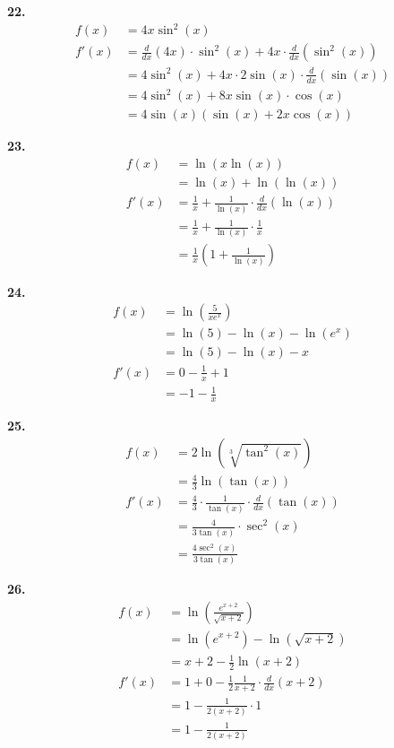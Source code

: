 \documentclass[10pt,oneside,]{book}
\theoremstyle{plain}
\theoremstyle{definition}
\numberwithin{equation}{section}
\newcommand{\fe}[2]{#1\mathopen{}\left(#2\right)\mathclose{}}
\newcommand{\fd}[1]{#1'}
\newcommand{\lzoo}[2]{{\frac{d}{d#1}}{\left(#2\right)}}
\begin{document}
\noindent\textbf{22.}\quad{}\begin{align*}
\fe{f}{x}&=4x\fe{\sin^2}{x}\\
\fe{\fd{f}}{x}&=\lzoo{x}{4x}\cdot\fe{\sin^2}{x}+4x\cdot\lzoo{x}{\fe{\sin^2}{x}}\\
&=4\fe{\sin^2}{x}+4x\cdot2\fe{\sin}{x}\cdot\lzoo{x}{\fe{\sin}{x}}\\
&=4\fe{\sin^2}{x}+8x\fe{\sin}{x}\cdot\fe{\cos}{x}\\
&=4\fe{\sin}{x}\left(\fe{\sin}{x}+2x\fe{\cos}{x}\right)
\end{align*}%
\par\smallskip
\noindent\textbf{23.}\quad{}\begin{align*}
\fe{f}{x}&=\fe{\ln}{x\fe{\ln}{x}}\\
&=\fe{\ln}{x}+\fe{\ln}{\fe{\ln}{x}}\\
\fe{\fd{f}}{x}&=\frac{1}{x}+\frac{1}{\fe{\ln}{x}}\cdot\lzoo{x}{\fe{\ln}{x}}\\
&=\frac{1}{x}+\frac{1}{\fe{\ln}{x}}\cdot\frac{1}{x}\\
&=\frac{1}{x}\left(1+\frac{1}{\fe{\ln}{x}}\right)
\end{align*}%
\par\smallskip
\noindent\textbf{24.}\quad{}\begin{align*}
\fe{f}{x}&=\fe{\ln}{\frac{5}{xe^x}}\\
&=\fe{\ln}{5}-\fe{\ln}{x}-\fe{\ln}{e^x}\\
&=\fe{\ln}{5}-\fe{\ln}{x}-x\\
\fe{\fd{f}}{x}&=0-\frac{1}{x}+1\\
&=-1-\frac{1}{x}
\end{align*}%
\par\smallskip
\noindent\textbf{25.}\quad{}\begin{align*}
\fe{f}{x}&=2\fe{\ln}{\sqrt[3]{\fe{\tan^2}{x}}}\\
&=\frac{4}{3}\fe{\ln}{\fe{\tan}{x}}\\
\fe{\fd{f}}{x}&=\frac{4}{3}\cdot\frac{1}{\fe{\tan}{x}}\cdot\lzoo{x}{\fe{\tan}{x}}\\
&=\frac{4}{3\fe{\tan}{x}}\cdot\fe{\sec^2}{x}\\
&=\frac{4\fe{\sec^2}{x}}{3\fe{\tan}{x}}
\end{align*}%
\par\smallskip
\noindent\textbf{26.}\quad{}\begin{align*}
\fe{f}{x}&=\fe{\ln}{\frac{e^{x+2}}{\sqrt{x+2}}}\\
&=\fe{\ln}{e^{x+2}}-\fe{\ln}{\sqrt{x+2}}\\
&=x+2-\frac{1}{2}\fe{\ln}{x+2}\\
\fe{\fd{f}}{x}&=1+0-\frac{1}{2}\frac{1}{x+2}\cdot\lzoo{x}{x+2}\\
&=1-\frac{1}{2(x+2)}\cdot1\\
&=1-\frac{1}{2(x+2)}
\end{align*}%
\end{document}
